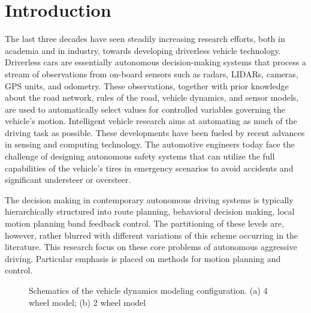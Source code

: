 \documentclass[conference, onecolumn]{IEEEtran}
\begin{document}
\section{Introduction}
The last three decades have seen steadily increasing research efforts, both in academia and in industry, towards developing driverless vehicle technology. Driverless cars are essentially autonomous decision-making systems that process a stream of observations from on-board sensors such as radars, LIDARs, cameras, GPS units, and odometry. These observations, together with prior knowledge about the road network, rules of the road, vehicle dynamics, and sensor models, are used to automatically select values for controlled variables governing the vehicle’s motion. Intelligent vehicle research aims at automating as much of the driving task as possible. These developments have been fueled by recent advances in sensing and computing technology. The automotive engineers today face the challenge of designing autonomous safety systems that can utilize the full capabilities of the vehicle’s tires in emergency scenarios to avoid accidents and significant understeer or oversteer\cite{eskandarian2021research}\cite{Li2010OnTD}. %

The decision making in contemporary autonomous driving systems is typically hierarchically structured into route planning, behavioral decision making, local motion planning band feedback control\cite{paden2016survey}. The partitioning of these levels are, however, rather blurred with different variations of this scheme occurring in the literature. This research focus on these core problems of autonomous aggressive driving. Particular emphasis is placed on methods for motion planning and control. 
\begin{figure}[h]
	\label{fig:three graphs}
	\caption{Schematics of the vehicle dynamics modeling configuration. \newline  (a) 4 wheel model; (b) 2 wheel model}
\end{figure}
\end{document}
